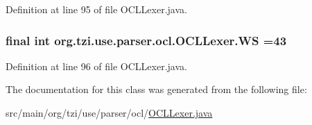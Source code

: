 Definition at line 95 of file O\-C\-L\-Lexer.\-java.

\hypertarget{classorg_1_1tzi_1_1use_1_1parser_1_1ocl_1_1_o_c_l_lexer_ab18ff0e9e715b011729dc4d9fbe4f104}{
\subsubsection[{W\-S}]{\setlength{\rightskip}{0pt plus 5cm}final int org.\-tzi.\-use.\-parser.\-ocl.\-O\-C\-L\-Lexer.\-W\-S =43\hspace{0.3cm}{\ttfamily [static]}}}\label{classorg_1_1tzi_1_1use_1_1parser_1_1ocl_1_1_o_c_l_lexer_ab18ff0e9e715b011729dc4d9fbe4f104}


Definition at line 96 of file O\-C\-L\-Lexer.\-java.



The documentation for this class was generated from the following file\-:\begin{DoxyCompactItemize}
\item 
src/main/org/tzi/use/parser/ocl/\hyperlink{_o_c_l_lexer_8java}{O\-C\-L\-Lexer.\-java}\end{DoxyCompactItemize}

